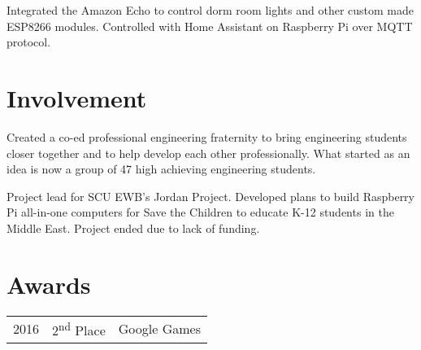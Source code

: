 \documentclass[]{deedy-resume-openfont}
\begin{document}
\begin{minipage}[t]{0.66\textwidth}
\begin{tightemize}
\item Integrated the Amazon Echo to control dorm room lights and other
custom made ESP8266 modules. Controlled with Home Assistant on
Raspberry Pi over MQTT protocol.  
\end{tightemize}
\sectionsep



\section{Involvement}
\begin{tightemize}
\item Created a co-ed professional engineering fraternity to bring
engineering students closer together and to help develop each other
professionally. What started as an idea is now a group of 47 high achieving
engineering students. 
\end{tightemize}
\sectionsep

\begin{tightemize}
\item Project lead for SCU EWB’s Jordan Project. Developed plans to build
Raspberry Pi all-in-one computers for Save the Children to educate K-12
students in the Middle East. Project ended due to lack of funding.
\end{tightemize}
\sectionsep



\section{Awards} 
\begin{tabular}{rll}
2016	     & 2\textsuperscript{nd} Place  & Google Games\\
\end{tabular}
\sectionsep


\end{minipage} 
\end{document}
